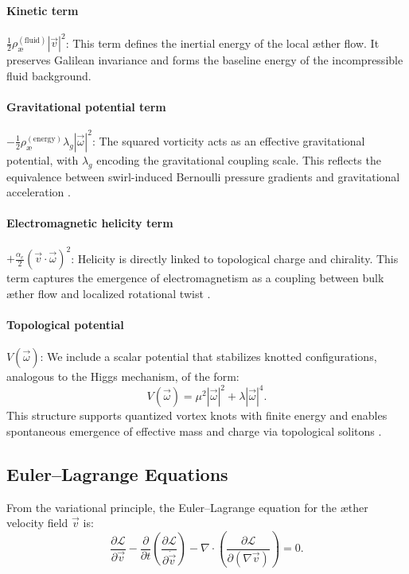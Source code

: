 \paragraph{Kinetic term}
$\frac{1}{2} \rho_\text{\ae}^{(\text{fluid})} |\vec{v}|^2$:
This term defines the inertial energy of the local \ae{}ther flow. It preserves Galilean invariance and forms the baseline energy of the incompressible fluid background.

\paragraph{Gravitational potential term}
$-\frac{1}{2} \rho_\text{\ae}^{(\text{energy})} \lambda_g |\vec{\omega}|^2$:
The squared vorticity acts as an effective gravitational potential, with $\lambda_g$ encoding the gravitational coupling scale. This reflects the equivalence between swirl-induced Bernoulli pressure gradients and gravitational acceleration \cite{helmholtz1858integrals, batchelor2000introduction}.

\paragraph{Electromagnetic helicity term}
$+\frac{\alpha_e}{2} (\vec{v} \cdot \vec{\omega})^2$:
Helicity is directly linked to topological charge and chirality. This term captures the emergence of electromagnetism as a coupling between bulk æther flow and localized rotational twist \cite{moffatt1969degree, kato1990topological}.

\paragraph{Topological potential}
$V(\vec{\omega})$:
We include a scalar potential that stabilizes knotted configurations, analogous to the Higgs mechanism, of the form:
\begin{equation}
V(\vec{\omega}) = \mu^2 |\vec{\omega}|^2 + \lambda |\vec{\omega}|^4.
\end{equation}
This structure supports quantized vortex knots with finite energy and enables spontaneous emergence of effective mass and charge via topological solitons \cite{ranada1990topological, arrayas2017knots}.

\subsection{Euler--Lagrange Equations}

From the variational principle, the Euler--Lagrange equation for the \ae{}ther velocity field $\vec{v}$ is:
\begin{equation}
\frac{\partial \mathcal{L}}{\partial \vec{v}}
- \frac{\partial}{\partial t} \left( \frac{\partial \mathcal{L}}{\partial \dot{\vec{v}}} \right)
- \nabla \cdot \left( \frac{\partial \mathcal{L}}{\partial (\nabla \vec{v})} \right) = 0.
\end{equation}

